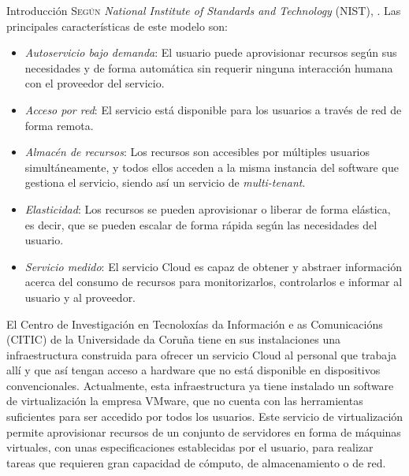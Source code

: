 \begin{chapter}{Introducción}
\label{chap:introducion}
\lettrine{S}{egún} \textit{National Institute of Standards and Technology} (NIST), \cite{computing}. Las principales características de este modelo son\label{nist}:
\begin{itemize}
    \item \emph{Autoservicio bajo demanda}: El usuario puede aprovisionar recursos según sus necesidades y de forma automática sin requerir ninguna interacción humana con el proveedor del servicio.
    \item \emph{Acceso por red}: El servicio está disponible para los usuarios a través de red de forma remota.
    \item \emph{Almacén de recursos}: Los recursos son accesibles por múltiples usuarios simultáneamente, y todos ellos acceden a la misma instancia del software que gestiona el servicio, siendo así un servicio de \textit{multi-tenant}.
    \item \emph{Elasticidad}: Los recursos se pueden aprovisionar o liberar de forma elástica, es decir, que se pueden escalar de forma rápida según las necesidades del usuario.
    \item \emph{Servicio medido}: El servicio Cloud es capaz de obtener y abstraer información acerca del consumo de recursos para monitorizarlos, controlarlos e informar al usuario y al proveedor.
\end{itemize}

 El Centro de Investigación en Tecnoloxías da Información e as Comunicacións (CITIC) de la Universidade da Coruña tiene en sus instalaciones una infraestructura construida para ofrecer un servicio Cloud al personal que trabaja allí y que así tengan acceso a hardware que no está disponible en dispositivos convencionales. Actualmente, esta infraestructura ya tiene instalado un software de virtualización la empresa VMware, que no cuenta con las herramientas suficientes para ser accedido por todos los usuarios. Este servicio de virtualización permite aprovisionar recursos de un conjunto de servidores en forma de máquinas virtuales, con unas especificaciones establecidas por el usuario, para realizar tareas que requieren gran capacidad de cómputo, de almacenamiento o de red.


\end{chapter}

